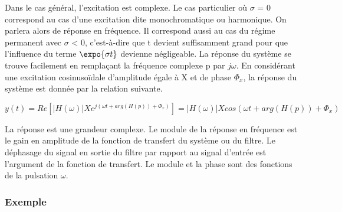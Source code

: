 	Dans le cas général, l'excitation est complexe. Le cas
        particulier où $\sigma$ = 0 correspond au cas d'une excitation
        dite monochromatique ou harmonique. On parlera alors de
        réponse en fréquence. Il correspond aussi au cas du régime
        permanent avec $\sigma$ < 0, c'est-à-dire que t devient
        suffisamment grand pour que l'influence du terme
        $\expo{\sigma t}$ devienne négligeable.  La réponse du système se
        trouve facilement en remplaçant la fréquence complexe p par
        $j\omega$. En considérant une excitation cosinusoïdale
        d'amplitude égale à X et de phase $\Phi_{x}$, la réponse du
        système est donnée par la relation suivante.
	
	\begin{equation}\label{calcul_reponse_fonction_transfert}
          y(t) = Re[|H(\omega)|X e^{j(\omega t+arg(H(p))+\Phi_{x})}] =|H(\omega)|X cos(\omega t+arg(H(p))+\Phi_{x})
	\end{equation}
	
	La réponse est une grandeur complexe. Le module de la réponse
        en fréquence est le gain en amplitude de la fonction de
        transfert du système ou du filtre. Le déphasage du signal en
        sortie du filtre par rapport au signal d'entrée est l'argument
        de la fonction de transfert. Le module et la phase sont des
        fonctions de la pulsation $\omega$.
	
	
	\subsubsection{Exemple}
	
